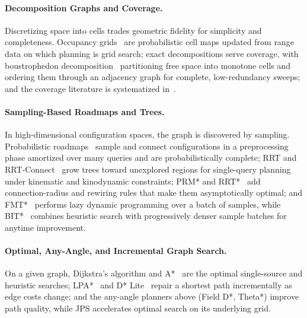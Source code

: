 \paragraph{Decomposition Graphs and Coverage.}
Discretizing space into cells trades geometric fidelity for simplicity and completeness. Occupancy grids~\cite{Moravec1985SonarMaps,Elfes1989Occupancy} are probabilistic cell maps updated from range data on which planning is grid search; exact decompositions serve coverage, with boustrophedon decomposition~\cite{Choset1998Boustro} partitioning free space into monotone cells and ordering them through an adjacency graph for complete, low-redundancy sweeps; and the coverage literature is systematized in~\cite{Galceran2013CoverageSurvey}.

\paragraph{Sampling-Based Roadmaps and Trees.}
In high-dimensional configuration spaces, the graph is discovered by sampling. Probabilistic roadmaps~\cite{Kavraki1996PRM} sample and connect configurations in a preprocessing phase amortized over many queries and are probabilistically complete; RRT and RRT-Connect~\cite{LaValle1998RRT,Kuffner2000RRTConnect} grow trees toward unexplored regions for single-query planning under kinematic and kinodynamic constraints; PRM* and RRT*~\cite{Karaman2011RRTStar} add connection-radius and rewiring rules that make them asymptotically optimal; and FMT*~\cite{Janson2015FMT} performs lazy dynamic programming over a batch of samples, while BIT*~\cite{Gammell2015BIT} combines heuristic search with progressively denser sample batches for anytime improvement.

\paragraph{Optimal, Any-Angle, and Incremental Graph Search.}
On a given graph, Dijkstra's algorithm and A*~\cite{Dijkstra1959,Hart1968Astar} are the optimal single-source and heuristic searches; LPA*~\cite{Koenig2004LPA} and D* Lite~\cite{Koenig2002DstarLite} repair a shortest path incrementally as edge costs change; and the any-angle planners above (Field D*, Theta*) improve path quality, while JPS accelerates optimal search on its underlying grid.

